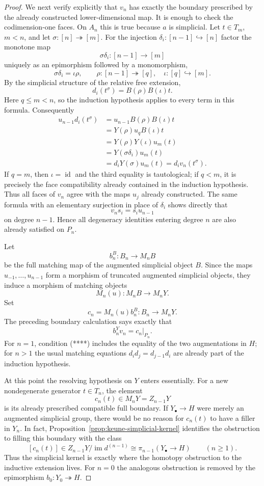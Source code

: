 \documentclass[11pt,a4paper]{article}
\theoremstyle{definition}
\newcommand{\id}{\operatorname{id}}
\begin{document}
\begin{proof}
We next verify explicitly that $v_n$ has exactly the boundary prescribed
by the already constructed lower-dimensional map.  It is enough to
check the codimension-one faces.  On $A_n$ this is true because $a$ is
simplicial.  Let $t\in T_m$, $m<n$, and let
$\sigma:[n]\twoheadrightarrow[m]$.  For the injection
$\delta_i:[n-1]\hookrightarrow[n]$ factor the monotone map
\[
 \sigma\delta_i:[n-1]\longrightarrow[m]
\]
uniquely as an epimorphism followed by a monomorphism,
\[
 \sigma\delta_i=\iota\rho,
 \qquad
 \rho:[n-1]\twoheadrightarrow[q],\quad
 \iota:[q]\hookrightarrow[m].             \tag{***}
\]
By the simplicial structure of the relative free extension,
\[
 d_i(t^\sigma)=B(\rho)B(\iota)t.
\]
Here $q\leq m<n$, so the induction hypothesis applies to every term in
this formula.  Consequently
\begin{align*}
 u_{n-1}d_i(t^\sigma)
 &=u_{n-1}B(\rho)B(\iota)t\\
 &=Y(\rho)u_qB(\iota)t\\
 &=Y(\rho)Y(\iota)u_m(t)\\
 &=Y(\sigma\delta_i)u_m(t)\\
 &=d_iY(\sigma)u_m(t)
  =d_iv_n(t^\sigma).
\end{align*}
If $q=m$, then $\iota=\id$ and the third equality is tautological; if
$q<m$, it is precisely the face compatibility already contained in the
induction hypothesis.  Thus all faces of $v_n$ agree with the maps
$u_j$ already constructed.  The same formula with an elementary
surjection in place of $\delta_i$ shows directly that
\[
 v_ns_i=s_iu_{n-1}
\]
on degree $n-1$.  Hence all degeneracy identities entering degree $n$
are also already satisfied on $P_n$.

Let
\[
 b_n^B:B_n\longrightarrow M_nB
\]
be the full matching map of the augmented simplicial object $B$.  Since
the maps $u_{-1},\ldots,u_{n-1}$ form a morphism of truncated augmented
simplicial objects, they induce a morphism of matching objects
\[
 M_n(u):M_nB\longrightarrow M_nY.
\]
Set
\[
 c_n=M_n(u)b_n^B:B_n\longrightarrow M_nY.
\]
The preceding boundary calculation says exactly that
\[
 b_n^Yv_n=c_n|_{P_n}.                       \tag{****}
\]
For $n=1$, condition (****) includes the equality of the two
augmentations in $H$; for $n>1$ the usual matching equations
$d_id_j=d_{j-1}d_i$ are already part of the induction hypothesis.

At this point the resolving hypothesis on $Y$ enters essentially.
For a new nondegenerate generator $t\in T_n$, the element
\[
 c_n(t)\in M_nY=Z_{n-1}Y
\]
is its already prescribed compatible full boundary. If $Y_\bullet\to H$
were merely an augmented simplicial group, there would be no reason for
$c_n(t)$ to have a filler in $Y_n$. In fact,
Proposition~\ref{prop:keune-simplicial-kernel} identifies the obstruction
to filling this boundary with the class
\[
 [c_n(t)]\in
 Z_{n-1}Y/\operatorname{im}d^{(n-1)}
 \cong \pi_{n-1}(Y_\bullet\to H)
 \qquad(n\geq1).
\]
Thus the simplicial kernel is exactly where the homotopy obstruction to
the inductive extension lives. For $n=0$ the analogous obstruction is
removed by the epimorphism $b_0:Y_0\twoheadrightarrow H$.


\end{proof}
\end{document}

